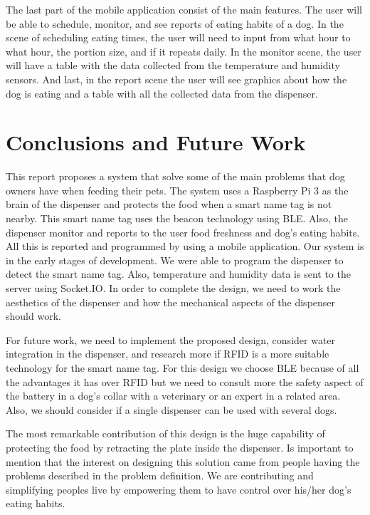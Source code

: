 \documentclass[12pt]{article}
\begin{document}
The last part of the mobile application consist of the main features. The user will be able to schedule, monitor, and see reports of eating habits of a dog. In the scene of scheduling eating times, the user will need to input from what hour to what hour, the portion size, and if it repeats daily. In the monitor scene, the user will have a table with the data collected from the temperature and humidity sensors. And last, in the report scene the user will see graphics about how the dog is eating and a table with all the collected data from the dispenser.


\section{Conclusions and Future Work}

This report proposes a system that solve some of the main problems that dog owners have when feeding their pets. The system uses a Raspberry Pi 3 as the brain of the dispenser and protects the food when a smart name tag is not nearby. This smart name tag uses the beacon technology using BLE. Also, the dispenser monitor and reports to the user food freshness and dog's eating habits. All this is reported and programmed by using a mobile application. Our system is in the early stages of development. We were able to program the dispenser to detect the smart name tag. Also, temperature and humidity data is sent to the server using Socket.IO. In order to complete the design, we need to work the aesthetics of the dispenser and how the mechanical aspects of the dispenser should work.

For future work, we need to implement the proposed design, consider water integration in the dispenser, and research more if RFID is a more suitable technology for the smart name tag. For this design we choose BLE because of all the advantages it has over RFID but we need to consult more the safety aspect of the battery in a dog's collar with a veterinary or an expert in a related area. Also, we should consider if a single dispenser can be used with several dogs.

The most remarkable contribution of this design is the huge capability of protecting the food by retracting the plate inside the dispenser. Is important to mention that the interest on designing this solution came from people having the problems described in the problem definition. We are contributing and simplifying peoples live by empowering them to have control over his/her dog's eating habits.
\end{document}
